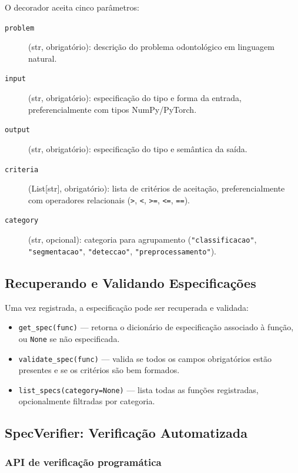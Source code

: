 O decorador aceita cinco parâmetros:

\begin{description}
  \item[\texttt{problem}] (str, obrigatório): descrição do problema
    odontológico em linguagem natural.
  \item[\texttt{input}] (str, obrigatório): especificação do tipo e
    forma da entrada, preferencialmente com tipos NumPy/PyTorch.
  \item[\texttt{output}] (str, obrigatório): especificação do tipo e
    semântica da saída.
  \item[\texttt{criteria}] (List[str], obrigatório): lista de critérios
    de aceitação, preferencialmente com operadores relacionais
    (\texttt{>}, \texttt{<}, \texttt{>=}, \texttt{<=}, \texttt{==}).
  \item[\texttt{category}] (str, opcional): categoria para agrupamento
    (\texttt{"classificacao"}, \texttt{"segmentacao"},
    \texttt{"deteccao"}, \texttt{"preprocessamento"}).
\end{description}

\subsection{Recuperando e Validando Especificações}

Uma vez registrada, a especificação pode ser recuperada e validada:

\begin{itemize}
  \item \texttt{get\_spec(func)} — retorna o dicionário de especificação
    associado à função, ou \texttt{None} se não especificada.
  \item \texttt{validate\_spec(func)} — valida se todos os campos
    obrigatórios estão presentes e se os critérios são bem formados.
  \item \texttt{list\_specs(category=None)} — lista todas as funções
    registradas, opcionalmente filtradas por categoria.
\end{itemize}

\subsection{SpecVerifier: Verificação Automatizada}

\subsubsection{API de verificação programática}


